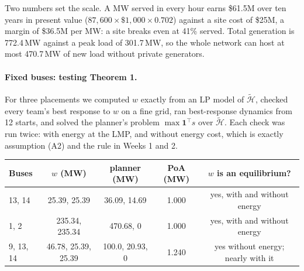 \documentclass[10pt]{article}
\newcommand{\MW}{\ensuremath{\,\mathrm{MW}}}
\begin{document}
Two numbers set the scale. A MW served in every hour earns
\$61.5M over ten years in present value ($87{,}600 \times \$1{,}000 \times 0.702$) against a site cost of
\$25M, a margin of \$36.5M per MW: a site breaks even at 41\% served. Total
generation is 772.4\MW{} against a peak load of 301.7\MW, so the whole network
can host at most 470.7\MW{} of new load without private generators.

\paragraph{Fixed buses: testing Theorem 1.} For three placements we
computed $w$ exactly from an LP model of $\widetilde{\mathcal H}$, checked every
team's best response to $w$ on a fine grid, ran best-response dynamics from 12
starts, and solved the planner's problem $\max \mathbf 1^{\top} s$ over
$\widetilde{\mathcal H}$. Each check was run twice: with energy at the LMP, and
without energy cost, which is exactly assumption (A2) and the rule in Weeks 1
and 2.
\begin{center}
\small
\begin{tabular}{@{}lcccc@{}}
\toprule
Buses & $w$ (MW) & planner (MW) & PoA (MW) & $w$ is an equilibrium?\\
\midrule
13, 14 & 25.39, 25.39 & 36.09, 14.69 & 1.000 & yes, with and without energy\\
1, 2 & 235.34, 235.34 & 470.68, 0 & 1.000 & yes, with and without energy\\
9, 13, 14 & 46.78, 25.39, 25.39 & 100.0, 20.93, 0 & 1.240 & yes without energy; nearly with it\\
\bottomrule
\end{tabular}
\end{center}
\end{document}
